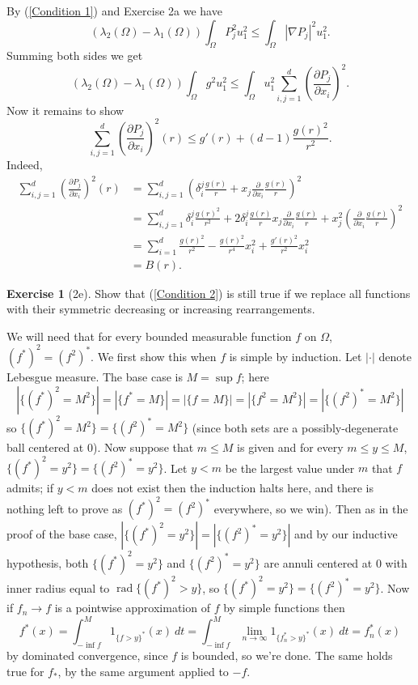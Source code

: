 \documentclass[10pt]{article}
\DeclareMathOperator{\rad}{rad}
\theoremstyle{definition}
\newtheorem{exer}{Exercise}
\begin{document}
By (\ref{Condition 1}) and Exercise 2a we have
$$(\lambda_2(\Omega) - \lambda_1(\Omega)) \int_\Omega P_j^2 u_1^2 \leq \int_\Omega |\nabla P_j|^2 u_1^2.$$
Summing both sides we get
$$(\lambda_2(\Omega) - \lambda_1(\Omega)) \int_\Omega g^2 u_1^2 \leq \int_\Omega u_1^2 \sum_{i,j=1}^d \left(\frac{\partial P_j}{\partial x_i}\right)^2.$$
Now it remains to show
$$\sum_{i,j=1}^d \left(\frac{\partial P_j}{\partial x_i}\right)^2(r) \leq g'(r) + (d - 1)\frac{g(r)^2}{r^2}.$$
Indeed,
\begin{align*}
\sum_{i,j=1}^d \left(\frac{\partial P_j}{\partial x_i}\right)^2(r) &= \sum_{i,j=1}^d \left(\delta_i^j \frac{g(r)}{r} + x_j \frac{\partial}{\partial x_i} \frac{g(r)}{r}\right)^2\\
&= \sum_{i,j=1}^d \delta_i^j \frac{g(r)^2}{r^2} + 2\delta_i^j \frac{g(r)}{r} x_j \frac{\partial}{\partial x_i} \frac{g(r)}{r} + x_j^2 \left(\frac{\partial}{\partial x_i} \frac{g(r)}{r}\right)^2\\
&= \sum_{i=1}^d \frac{g(r)^2}{r^2} - \frac{g(r)^2}{r^4} x_i^2 + \frac{g'(r)^2}{r^2} x_i^2 \\
&= B(r).
\end{align*}

\begin{exer}[2e]
Show that (\ref{Condition 2}) is still true if we replace all functions with their symmetric decreasing or increasing rearrangements.
\end{exer}

We will need that for every bounded measurable function $f$ on $\Omega$, $(f^*)^2 = (f^2)^*$.
We first show this when $f$ is simple by induction.
Let $|\cdot|$ denote Lebesgue measure.
The base case is $M = \sup f$; here
$$|\{(f^*)^2 = M^2\}| = |\{f^* = M\}| = |\{f = M\}| = |\{f^2 = M^2\}| = |\{(f^2)^* = M^2\}|$$
so $\{(f^*)^2 = M^2\} = \{(f^2)^* = M^2\}$ (since both sets are a possibly-degenerate ball centered at $0$).
Now suppose that $m \leq M$ is given and for every $m \leq y \leq M$, $\{(f^*)^2 = y^2\} = \{(f^2)^* = y^2\}$.
Let $y < m$ be the largest value under $m$ that $f$ admits; if $y < m$ does not exist then the induction halts here, and there is nothing left to prove as $(f^*)^2 = (f^2)^*$ everywhere, so we win).
Then as in the proof of the base case, $|\{(f^*)^2 = y^2\}| = |\{(f^2)^* = y^2\}|$ and by our inductive hypothesis, both $\{(f^*)^2 = y^2\}$ and $\{(f^2)^* = y^2\}$ are annuli centered at $0$ with inner radius equal to $\rad \{(f^*)^2 > y\}$, so $\{(f^*)^2 = y^2\} = \{(f^2)^* = y^2\}$.
Now if $f_n \to f$ is a pointwise approximation of $f$ by simple functions then
$$f^*(x) = \int_{-\inf f}^M 1_{\{f > y\}^*}(x) ~dt = \int_{-\inf f}^M \lim_{n \to \infty} 1_{\{f_n^* > y\}^*}(x) ~dt = f_n^*(x)$$
by dominated convergence, since $f$ is bounded, so we're done.
The same holds true for $f_*$, by the same argument applied to $-f$.
\end{document}
